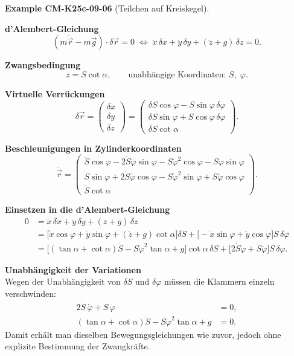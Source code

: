 \documentclass[10pt, letterpaper]{article}
\newcommand{\CustomHeading}[3]{%
  \par\medskip\noindent%
  \textbf{#1 #2} \textnormal{(#3)}.\enskip%
}
\newenvironment{EXA}[2]{\CustomHeading{Example}{#1}{#2}}{}
\begin{document}
\begin{EXA}{CM-K25c-09-06}{Teilchen auf Kreiskegel}
\textbf{d'Alembert-Gleichung}\\
\[
  (m\ddot{\vec r}-m\vec g)\!\cdot\!\delta\vec r = 0
  \;\Longleftrightarrow\;
  \ddot x\,\delta x + \ddot y\,\delta y + (\ddot z + g)\,\delta z = 0 .
\]

\textbf{Zwangsbedingung}\\
\[
  z = S\cot\alpha,
  \qquad\text{unabhängige Koordinaten: } S,\;\varphi .
\]

\textbf{Virtuelle Verrückungen}\\[-6pt]
\[
  \delta\vec r=
  \begin{pmatrix}
    \delta x\\ \delta y\\ \delta z
  \end{pmatrix}
  =
  \begin{pmatrix}
    \delta S\cos\varphi - S\sin\varphi\,\delta\varphi\\[2pt]
    \delta S\sin\varphi + S\cos\varphi\,\delta\varphi\\[2pt]
    \delta S\cot\alpha
  \end{pmatrix}.
\]

\textbf{Beschleunigungen in Zylinderkoordinaten}\\[-6pt]
\[
  \ddot{\vec r}=
  \begin{pmatrix}
    \ddot S\cos\varphi - 2\dot S\dot\varphi\sin\varphi
      - S\dot\varphi^{2}\cos\varphi - S\ddot\varphi\sin\varphi\\[2pt]
    \ddot S\sin\varphi + 2\dot S\dot\varphi\cos\varphi
      - S\dot\varphi^{2}\sin\varphi + S\ddot\varphi\cos\varphi\\[2pt]
    \ddot S\cot\alpha
  \end{pmatrix}.
\]

\textbf{Einsetzen in die d'Alembert-Gleichung}\\[-6pt]
\[
\begin{aligned}
  0 &=
  \ddot x\,\delta x + \ddot y\,\delta y + (\ddot z+g)\,\delta z \\[4pt]
    &=
  \bigl[\ddot x\cos\varphi+\ddot y\sin\varphi + (\ddot z+g)\cot\alpha\bigr]\delta S
  +\bigl[-\ddot x\sin\varphi + \ddot y\cos\varphi\bigr]S\,\delta\varphi \\[4pt]
    &=
  \bigl[(\tan\alpha+\cot\alpha)\ddot S
        - S\dot\varphi^{2}\tan\alpha + g\bigr]\cot\alpha\,\delta S
  +\bigl[2\dot S\dot\varphi + S\ddot\varphi\bigr]S\,\delta\varphi .
\end{aligned}
\]

\textbf{Unabhängigkeit der Variationen}\\
Wegen der Unabhängigkeit von $\delta S$ und $\delta\varphi$ müssen die
Klammern einzeln verschwinden:
\[
  \boxed{
  \begin{aligned}
    2\dot S\,\dot\varphi + S\,\ddot\varphi &= 0,\\[2pt]
    (\tan\alpha+\cot\alpha)\ddot S
      - S\dot\varphi^{2}\tan\alpha + g &= 0.
  \end{aligned}}
\]
Damit erhält man dieselben Bewegungsgleichungen wie zuvor, jedoch ohne
explizite Bestimmung der Zwangkräfte.
\end{EXA}
\end{document}
